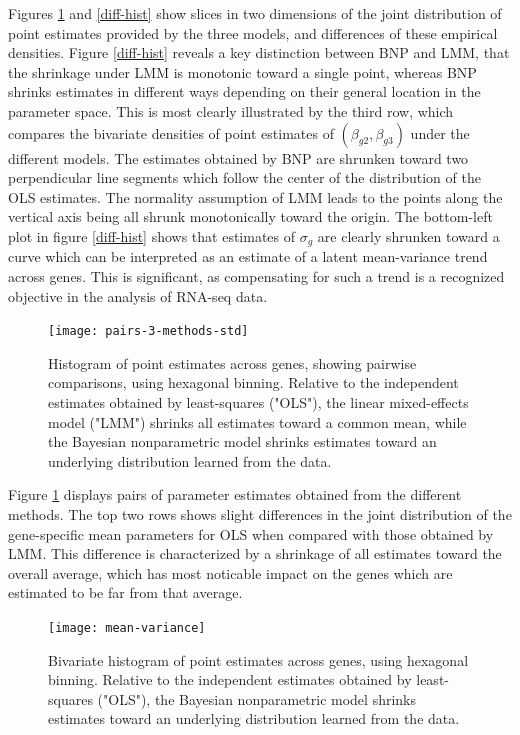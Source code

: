 {Figures \ref{pairs-3-methods} and \ref{diff-hist} show slices in two dimensions of the joint distribution of point estimates provided by the three models, and differences of these empirical densities. Figure \ref{diff-hist} reveals a key distinction between BNP and LMM, that the shrinkage under LMM is monotonic toward a single point, whereas BNP shrinks estimates in different ways depending on their general location in the parameter space. This is most clearly illustrated by the third row, which compares the bivariate densities of point estimates of $(\beta_{g2},\beta_{g3})$ under the different models. The estimates obtained by BNP are shrunken toward two perpendicular line segments which follow the center of the distribution of the OLS estimates. The normality assumption of LMM leads to the points along the vertical axis being all shrunk monotonically toward the origin. The bottom-left plot in figure \ref{diff-hist} shows that estimates of $\sigma_g$ are clearly shrunken toward a curve which can be interpreted as an estimate of a latent mean-variance trend across genes. This is significant, as compensating for such a trend is a recognized objective in the analysis of RNA-seq data.

\begin{figure}[ht]
\centering
\texttt{[image: pairs-3-methods-std]}
\caption{Histogram of point estimates across genes, showing pairwise comparisons, using hexagonal binning. Relative to the independent estimates obtained by least-squares ("OLS"), the linear mixed-effects model ("LMM") shrinks all estimates toward a common mean, while the Bayesian nonparametric model shrinks estimates toward an underlying distribution learned from the data.}
\label{pairs-3-methods}
\end{figure}

Figure \ref{pairs-3-methods} displays pairs of parameter estimates obtained from the different methods. The top two rows shows slight differences in the joint distribution of the gene-specific mean parameters for OLS when compared with those obtained by LMM. This difference is characterized by a shrinkage of all estimates toward the overall average, which has most noticable impact on the genes which are estimated to be far from that average.

\begin{figure}[ht]
\centering
\texttt{[image: mean-variance]}
\caption{\small Bivariate histogram of point estimates across genes, using hexagonal binning. Relative to the independent estimates obtained by least-squares ("OLS"), the Bayesian nonparametric model shrinks estimates toward an underlying distribution learned from the data.}
\label{mean-variance}
\end{figure}

}

